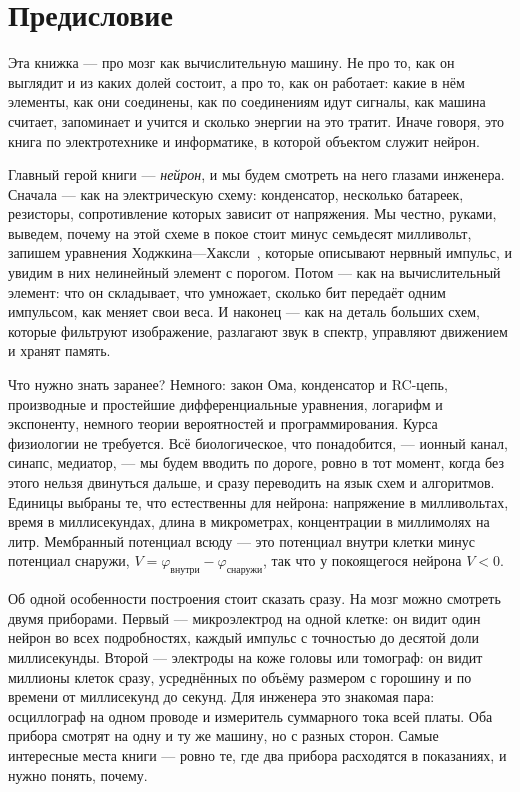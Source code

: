 \chapter{Предисловие}
Эта книжка --- про мозг как вычислительную машину. Не про то, как он выглядит и из каких долей состоит, а про то, как он работает: какие в нём элементы, как они соединены, как по соединениям идут сигналы, как машина считает, запоминает и учится и сколько энергии на это тратит. Иначе говоря, это книга по электротехнике и информатике, в которой объектом служит нейрон.

Главный герой книги --- \emph{нейрон}, и мы будем смотреть на него глазами инженера. Сначала --- как на электрическую схему: конденсатор, несколько батареек, резисторы, сопротивление которых зависит от напряжения. Мы честно, руками, выведем, почему на этой схеме в покое стоит минус семьдесят милливольт, запишем уравнения Ходжкина---Хаксли~\cite{HodgkinHuxley1952}, которые описывают нервный импульс, и увидим в них нелинейный элемент с порогом. Потом --- как на вычислительный элемент: что он складывает, что умножает, сколько бит передаёт одним импульсом, как меняет свои веса. И наконец --- как на деталь больших схем, которые фильтруют изображение, разлагают звук в спектр, управляют движением и хранят память.

Что нужно знать заранее? Немного: закон Ома, конденсатор и RC-цепь, производные и простейшие дифференциальные уравнения, логарифм и экспоненту, немного теории вероятностей и программирования. Курса физиологии не требуется. Всё биологическое, что понадобится, --- ионный канал, синапс, медиатор, --- мы будем вводить по дороге, ровно в тот момент, когда без этого нельзя двинуться дальше, и сразу переводить на язык схем и алгоритмов. Единицы выбраны те, что естественны для нейрона: напряжение в милливольтах, время в миллисекундах, длина в микрометрах, концентрации в миллимолях на литр. Мембранный потенциал всюду --- это потенциал внутри клетки минус потенциал снаружи, $V=\varphi_{\text{внутри}}-\varphi_{\text{снаружи}}$, так что у покоящегося нейрона $V<0$.

Об одной особенности построения стоит сказать сразу. На мозг можно смотреть двумя приборами. Первый --- микроэлектрод на одной клетке: он видит один нейрон во всех подробностях, каждый импульс с точностью до десятой доли миллисекунды. Второй --- электроды на коже головы или томограф: он видит миллионы клеток сразу, усреднённых по объёму размером с горошину и по времени от миллисекунд до секунд. Для инженера это знакомая пара: осциллограф на одном проводе и измеритель суммарного тока всей платы. Оба прибора смотрят на одну и ту же машину, но с разных сторон. Самые интересные места книги --- ровно те, где два прибора расходятся в показаниях, и нужно понять, почему.

